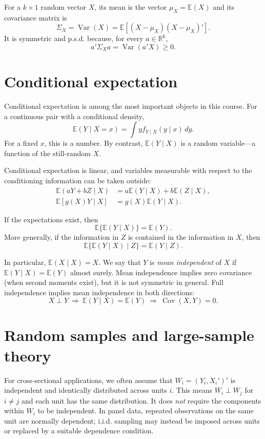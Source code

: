 For a $k\times1$ random vector $X$, its mean is the vector
$\mu_X=\mathbb E(X)$ and its covariance matrix is
\[
  \Sigma_X
  =\operatorname{Var}(X)
  =\mathbb E[(X-\mu_X)(X-\mu_X)'].
\]
It is symmetric and p.s.d. because, for every $a\in\mathbb R^k$,
\[
  a'\Sigma_Xa=\operatorname{Var}(a'X)\geq0.
\]

\section{Conditional expectation}

Conditional expectation is among the most important objects in this course.
For a continuous pair with a conditional density,
\[
  \mathbb E(Y\mid X=x)=\int y f_{Y\mid X}(y\mid x)\,dy.
\]
For a fixed $x$, this is a number.  By contrast,
$\mathbb E(Y\mid X)$ is a random variable---a function of the still-random
$X$.

Conditional expectation is linear, and variables measurable with respect to
the conditioning information can be taken outside:
\begin{align*}
  \mathbb E(aY+bZ\mid X)
    &=a\mathbb E(Y\mid X)+b\mathbb E(Z\mid X),\\
  \mathbb E[g(X)Y\mid X]
    &=g(X)\mathbb E(Y\mid X).
\end{align*}

\begin{theorem}
If the expectations exist, then
\[
  \mathbb E\{\mathbb E(Y\mid X)\}=\mathbb E(Y).
\]
More generally, if the information in $Z$ is contained in the information in
$X$, then
\[
  \mathbb E\{\mathbb E(Y\mid X)\mid Z\}=\mathbb E(Y\mid Z).
\]
\end{theorem}

In particular, $\mathbb E(X\mid X)=X$.  We say that $Y$ is \emph{mean
independent} of $X$ if $\mathbb E(Y\mid X)=\mathbb E(Y)$ almost surely.  Mean
independence implies zero covariance (when second moments exist), but it is
not symmetric in general.  Full independence implies mean independence in
both directions:
\[
  X\perp Y
  \ \Longrightarrow\ 
  \mathbb E(Y\mid X)=\mathbb E(Y)
  \ \Longrightarrow\ 
  \operatorname{Cov}(X,Y)=0.
\]

\section{Random samples and large-sample theory}

For cross-sectional applications, we often assume that
$W_i=(Y_i,X_i')'$ is independent and identically distributed across units
$i$.  This means $W_i\perp W_j$ for $i\neq j$ and each unit has the same
distribution.  It does \emph{not} require the components within $W_i$ to be
independent.  In panel data, repeated observations on the same unit are
normally dependent; i.i.d. sampling may instead be imposed across units or
replaced by a suitable dependence condition.

